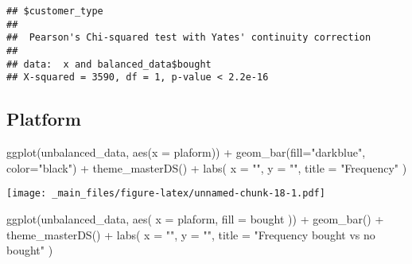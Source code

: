 \documentclass[
]{book}
\newenvironment{Shaded}{\begin{snugshade}}{\end{snugshade}}
\newcommand{\AttributeTok}[1]{\textcolor[rgb]{0.77,0.63,0.00}{#1}}
\newcommand{\FunctionTok}[1]{\textcolor[rgb]{0.00,0.00,0.00}{#1}}
\newcommand{\NormalTok}[1]{#1}
\newcommand{\SpecialCharTok}[1]{\textcolor[rgb]{0.00,0.00,0.00}{#1}}
\newcommand{\StringTok}[1]{\textcolor[rgb]{0.31,0.60,0.02}{#1}}
\begin{document}
\begin{verbatim}
## $customer_type
## 
##  Pearson's Chi-squared test with Yates' continuity correction
## 
## data:  x and balanced_data$bought
## X-squared = 3590, df = 1, p-value < 2.2e-16
\end{verbatim}

\hypertarget{platform}{%
\subsection{Platform}\label{platform}}

\begin{Shaded}
\end{Shaded}

\begin{Shaded}
\begin{Highlighting}[]
\FunctionTok{ggplot}\NormalTok{(unbalanced\_data, }\FunctionTok{aes}\NormalTok{(}\AttributeTok{x =}\NormalTok{ plaform)) }\SpecialCharTok{+}
    \FunctionTok{geom\_bar}\NormalTok{(}\AttributeTok{fill=}\StringTok{"darkblue"}\NormalTok{, }\AttributeTok{color=}\StringTok{"black"}\NormalTok{) }\SpecialCharTok{+}
    \FunctionTok{theme\_masterDS}\NormalTok{() }\SpecialCharTok{+}
    \FunctionTok{labs}\NormalTok{(}
      \AttributeTok{x =} \StringTok{""}\NormalTok{,}
      \AttributeTok{y =} \StringTok{""}\NormalTok{,}
      \AttributeTok{title =} \StringTok{"Frequency"}
\NormalTok{    )}
\end{Highlighting}
\end{Shaded}

\texttt{[image: \_main\_files/figure-latex/unnamed-chunk-18-1.pdf]}

\begin{Shaded}
\begin{Highlighting}[]
\FunctionTok{ggplot}\NormalTok{(unbalanced\_data, }\FunctionTok{aes}\NormalTok{( }\AttributeTok{x =}\NormalTok{ plaform, }\AttributeTok{fill =}\NormalTok{ bought )) }\SpecialCharTok{+}
    \FunctionTok{geom\_bar}\NormalTok{() }\SpecialCharTok{+}
    \FunctionTok{theme\_masterDS}\NormalTok{() }\SpecialCharTok{+}
    \FunctionTok{labs}\NormalTok{(}
      \AttributeTok{x =} \StringTok{""}\NormalTok{,}
      \AttributeTok{y =} \StringTok{""}\NormalTok{,}
      \AttributeTok{title =} \StringTok{"Frequency bought vs no bought"}
\NormalTok{    )}
\end{Highlighting}
\end{Shaded}
\end{document}
